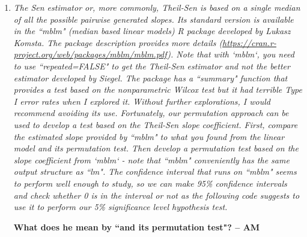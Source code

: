 \documentclass[11pt]{article}
\begin{document}
\begin{enumerate}
\item%
{\it The Sen estimator or, more commonly, Theil-Sen is based on a single median of all the possible pairwise generated slopes. Its standard version is available in the ``mblm" (median based linear models) R package developed by Lukasz Komsta. The package description provides more details (\url{https://cran.r-project.org/web/packages/mblm/mblm.pdf}). Note that with `mblm`, you need to use ``repeated=FALSE" to get the Theil-Sen estimator and not the better estimator developed by Siegel. The package has a ``summary" function that provides a test based on the nonparametric Wilcox test but it had terrible Type I error rates when I explored it. Without further explorations, I would recommend avoiding its use. Fortunately, our permutation approach can be used to develop a test based on the Theil-Sen slope coefficient. First, compare the estimated slope provided by ``mblm" to what you found from the linear model and its permutation test. Then develop a permutation test based on the slope coefficient from `mblm` - note that ``mblm" conveniently has the same output structure as ``lm". The confidence interval that runs on ``mblm" seems to perform well enough to study, so we can make 95\% confidence intervals and check whether 0 is in the interval or not as the following code suggests to use it to perform our 5\% significance level hypothesis test.}

{\bf What does he mean by ``and its permutation test"? -- AM}


\begin{knitrout}
\color{fgcolor}\begin{kframe}
\begin{alltt}
\hlkwb{<-}\hlopt{~}
 \hlkwb{<-} \hlstd{(model1s)[}\hlstd{]}

 \hlkwb{<-} \hlstd{(}\hlstd{(}\hlstd{,} \hlopt{$}
\end{alltt}


{\ttfamily\noindent\bfseries{}}\begin{alltt}
\hlopt{$} \hlkwb{<-} \hlopt{$}
\end{alltt}



\end{kframe}
\end{knitrout}
\end{enumerate}
\end{document}
